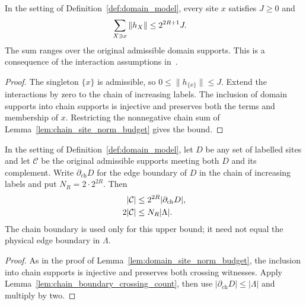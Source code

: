 \begin{lemma}
    \label{lem:domain_site_norm_budget}
    \leanok
    In the setting of Definition~\ref{def:domain_model}, every site $x$ satisfies
    $J\ge0$ and
    \begin{align}
        \sum_{X\ni x}\|h_X\| & \le 2^{2R+1}J.\notag
    \end{align}
    The sum ranges over the original admissible domain supports.
    This is a consequence of the interaction assumptions
    in~\cite[Part~I]{TNLean2026OneDimensional}.
\end{lemma}
\begin{proof}\leanok
    The singleton $\{x\}$ is admissible, so
    $0\le\|h_{\{x\}}\|\le J$.
    Extend the interactions by zero to the chain of increasing labels.
    The inclusion of domain supports into chain supports is injective and
    preserves both the terms and membership of $x$.
    Restricting the nonnegative chain sum of
    Lemma~\ref{lem:chain_site_norm_budget} gives the bound.
\end{proof}

\begin{lemma}
    \label{lem:domain_crossing_count}
    \leanok
    In the setting of Definition~\ref{def:domain_model}, let $D$ be any set of
    labelled sites and let $\mathcal C$ be the original admissible supports
    meeting both $D$ and its complement. Write $\partial_{\mathrm{ch}}D$
    for the edge boundary of $D$ in the chain of increasing labels and put
    $N_R=2\cdot2^{2R}$. Then
    \begin{align}
        |\mathcal C|  & \le 2^{2R}|\partial_{\mathrm{ch}}D|,\notag \\
        2|\mathcal C| & \le N_R|\Lambda|.\notag
    \end{align}
    The chain boundary is used only for this upper bound; it need not equal
    the physical edge boundary in $\Lambda$.
\end{lemma}
\begin{proof}\leanok
    As in the proof of Lemma~\ref{lem:domain_site_norm_budget}, the inclusion
    into chain supports is injective and preserves both crossing witnesses. Apply Lemma~\ref{lem:chain_boundary_crossing_count}, then use
    $|\partial_{\mathrm{ch}}D|\le |\Lambda|$ and multiply by two.
\end{proof}

